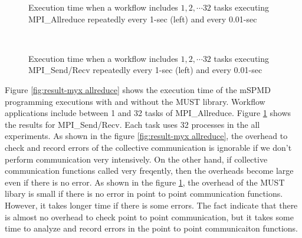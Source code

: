 \documentclass[graybox]{svmult}
\begin{document}
\begin{figure}[t]
 \begin{center}
\caption{Execution time when a workflow includes $1, 2, \cdots 32$ tasks executing MPI\_Allreduce repeatedly every 1-sec (left) and every 0.01-sec }
\label{fig:result-myx allreduce}
~\\
\caption{Execution time when a workflow includes $1, 2, \cdots 32$ tasks executing MPI\_Send/Recv repeatedly every 1-sec (left) and every 0.01-sec }
\label{fig:result-myx pingpong}
 \end{center}
\end{figure}

Figure \ref{fig:result-myx allreduce} shows the execution time of the mSPMD programming executions with and without the MUST library. Workflow applications include between 1 and 32 tasks of MPI\_Allreduce. 
Figure \ref{fig:result-myx pingpong} shows the results for MPI\_Send/Recv. 
Each task uses 32 processes in the all experiments. 
As shown in the figure \ref{fig:result-myx allreduce}, the overhead to check and record errors of the collective communication is ignorable if we don't perform communication very intensively. On the other hand, if collective communication functions called very freqently, then the overheads become large even if there is no error. 
As shown in the figure \ref{fig:result-myx pingpong}, the overhead of the MUST libary is small if there is no error in point to point communication functions.  However, it takes longer time if there is some errors. The fact indicate that there is almost no overhead to check point to point communication, but it takes some time to analyze and record errors in the point to point communicaiton functions. 
\end{document}
